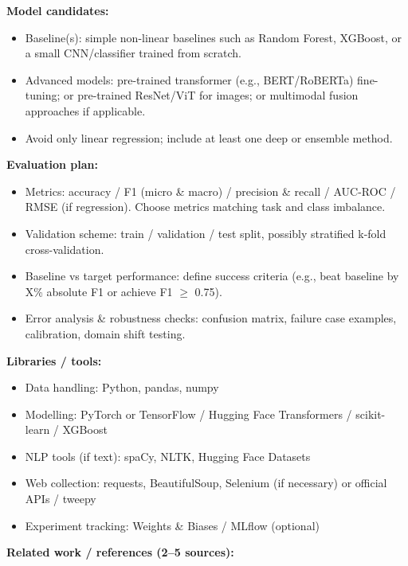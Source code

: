 \documentclass[12pt]{article}
\begin{document}
\textbf{Model candidates:}
\begin{itemize}
  \item Baseline(s): simple non-linear baselines such as Random Forest, XGBoost, or a small CNN/classifier trained from scratch.
  \item Advanced models: pre-trained transformer (e.g., BERT/RoBERTa) fine-tuning; or pre-trained ResNet/ViT for images; or multimodal fusion approaches if applicable.
  \item Avoid only linear regression; include at least one deep or ensemble method.
\end{itemize}

\textbf{Evaluation plan:}
\begin{itemize}
  \item Metrics: accuracy / F1 (micro \& macro) / precision \& recall / AUC-ROC / RMSE (if regression). Choose metrics matching task and class imbalance.
  \item Validation scheme: train / validation / test split, possibly stratified k-fold cross-validation.
  \item Baseline vs target performance: define success criteria (e.g., beat baseline by X\% absolute F1 or achieve F1 $\ge$ 0.75).
  \item Error analysis \& robustness checks: confusion matrix, failure case examples, calibration, domain shift testing.
\end{itemize}

\textbf{Libraries / tools:}
\begin{itemize}
  \item Data handling: Python, pandas, numpy
  \item Modelling: PyTorch or TensorFlow / Hugging Face Transformers / scikit-learn / XGBoost
  \item NLP tools (if text): spaCy, NLTK, Hugging Face Datasets
  \item Web collection: requests, BeautifulSoup, Selenium (if necessary) or official APIs / tweepy
  \item Experiment tracking: Weights \& Biases / MLflow (optional)
\end{itemize}

\textbf{Related work / references (2--5 sources):}
\end{document}
